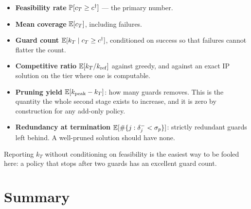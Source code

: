 \documentclass[11pt,a4paper]{article}
\begin{document}
\begin{itemize}
  \item \textbf{Feasibility rate} $\mathbb{P}[c_T \ge c^{\dagger}]$ --- the primary number.
  \item \textbf{Mean coverage} $\mathbb{E}[c_T]$, including failures.
  \item \textbf{Guard count} $\mathbb{E}[k_T \mid c_T \ge c^{\dagger}]$, conditioned on success so that
        failures cannot flatter the count.
  \item \textbf{Competitive ratio} $\mathbb{E}[k_T / k_{\mathrm{ref}}]$ against greedy, and against an
        exact IP solution \cite{couto2011,tozoni2016} on the  tier where one is
        computable.
  \item \textbf{Pruning yield} $\mathbb{E}[k_{\mathrm{peak}} - k_T]$: how many guards \stageII{} removes.
        This is the quantity the whole second stage exists to increase, and it is zero by
        construction for any add-only policy.
  \item \textbf{Redundancy at termination} $\mathbb{E}[\#\{j : \delta^{-}_j < \sigma_p\}]$: strictly
        redundant guards left behind. A well-pruned solution should have none.
\end{itemize}

Reporting $k_T$ without conditioning on feasibility is the easiest way to be fooled here: a
policy that stops after two guards has an excellent guard count.

\section{Summary}
\end{document}
